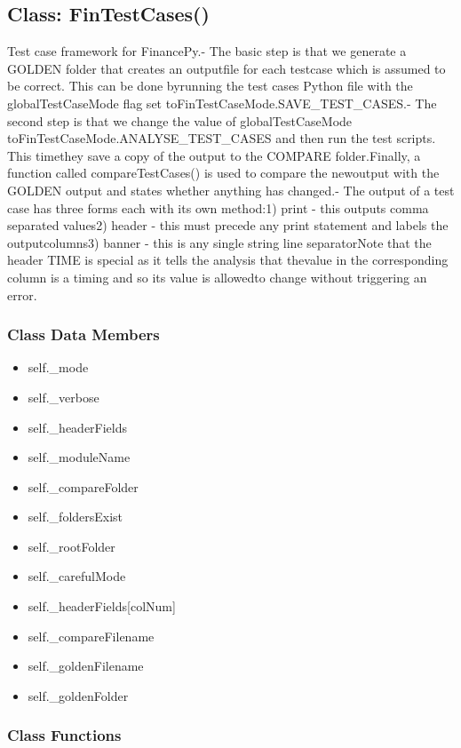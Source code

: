 \documentclass[twoside,11pt]{book}
\begin{document}
\subsection{Class: FinTestCases()}
Test case framework for FinancePy.- The basic step is that we generate a GOLDEN folder that creates an outputfile for each testcase which is assumed to be correct. This can be done byrunning the test cases Python file with the globalTestCaseMode flag set toFinTestCaseMode.SAVE\_TEST\_CASES.- The second step is that we change the value of globalTestCaseMode toFinTestCaseMode.ANALYSE\_TEST\_CASES and then run the test scripts. This timethey save a copy of the output to the COMPARE folder.Finally, a function called compareTestCases() is used to compare the newoutput with the GOLDEN output and states whether anything has changed.- The output of a test case has three forms each with its own method:1) print - this outputs comma separated values2) header - this must precede any print statement and labels the outputcolumns3) banner - this is any single string line separatorNote that the header TIME is special as it tells the analysis that thevalue in the corresponding column is a timing and so its value is allowedto change without triggering an error.

\subsubsection{Class Data Members}
\begin{itemize}
\item{self.\_mode}
\item{self.\_verbose}
\item{self.\_headerFields}
\item{self.\_moduleName}
\item{self.\_compareFolder}
\item{self.\_foldersExist}
\item{self.\_rootFolder}
\item{self.\_carefulMode}
\item{self.\_headerFields[colNum]}
\item{self.\_compareFilename}
\item{self.\_goldenFilename}
\item{self.\_goldenFolder}
\end{itemize}

\subsubsection{Class Functions}
\end{document}

